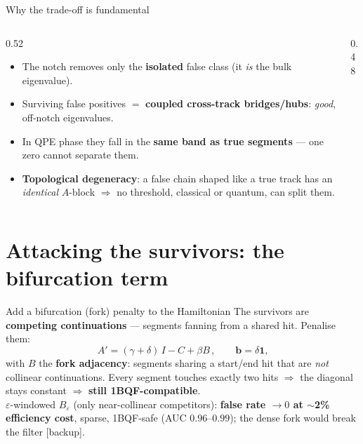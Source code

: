 \begin{frame}{Why the trade-off is fundamental}
  \begin{columns}[T]
    \begin{column}{0.52\textwidth}
      \begin{itemize}
        \item The notch removes only the \textbf{isolated} false class (it \emph{is} the bulk eigenvalue).
        \item Surviving false positives $=$ \textbf{coupled cross-track bridges/hubs}: \emph{good}, off-notch eigenvalues.
        \item In QPE phase they fall in the \textbf{same band as true segments} --- one zero cannot separate them.
        \item \textbf{Topological degeneracy}: a false chain shaped like a true track has an \emph{identical} $A$-block $\Rightarrow$ no threshold, classical or quantum, can split them.
      \end{itemize}
    \end{column}
    \begin{column}{0.48\textwidth}
      \centering{}
    \end{column}
  \end{columns}
\end{frame}

\section{Attacking the survivors: the bifurcation term}
\begin{frame}{Add a bifurcation (fork) penalty to the Hamiltonian}
  The survivors are \textbf{competing continuations} --- segments fanning from a shared hit. Penalise them:
  \[ \boxed{\,A' = (\gamma+\delta)\,I - C + \beta B\,},\qquad \mathbf{b}=\delta\mathbf{1}, \]
  with $B$ the \textbf{fork adjacency}: segments sharing a start/end hit that are \emph{not} collinear continuations.
  Every segment touches exactly two hits $\Rightarrow$ the diagonal stays constant $\Rightarrow$ \textbf{still 1BQF-compatible}.
  \medskip
  \centering{}\\[2pt]
  {\footnotesize $\varepsilon$-windowed $B_\varepsilon$ (only near-collinear competitors): \textbf{false rate $\to0$ at $\sim$2\% efficiency cost}, sparse, 1BQF-safe (AUC $0.96$--$0.99$); the dense fork would break the filter [backup].}
\end{frame}

